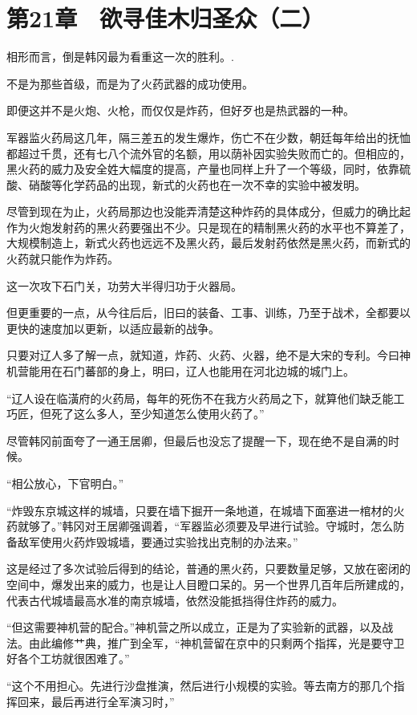 \section{第21章　欲寻佳木归圣众（二）}

相形而言，倒是韩冈最为看重这一次的胜利。.

不是为那些首级，而是为了火药武器的成功使用。

即便这并不是火炮、火枪，而仅仅是炸药，但好歹也是热武器的一种。

军器监火药局这几年，隔三差五的发生爆炸，伤亡不在少数，朝廷每年给出的抚恤都超过千贯，还有七八个流外官的名额，用以荫补因实验失败而亡的。但相应的，黑火药的威力及安全姓大幅度的提高，产量也同样上升了一个等级，同时，依靠硫酸、硝酸等化学药品的出现，新式的火药也在一次不幸的实验中被发明。

尽管到现在为止，火药局那边也没能弄清楚这种炸药的具体成分，但威力的确比起作为火炮发射药的黑火药要强出不少。只是现在的精制黑火药的水平也不算差了，大规模制造上，新式火药也远远不及黑火药，最后发射药依然是黑火药，而新式的火药就只能作为炸药。

这一次攻下石门关，功劳大半得归功于火器局。

但更重要的一点，从今往后后，旧曰的装备、工事、训练，乃至于战术，全都要以更快的速度加以更新，以适应最新的战争。

只要对辽人多了解一点，就知道，炸药、火药、火器，绝不是大宋的专利。今曰神机营能用在石门蕃部的身上，明曰，辽人也能用在河北边城的城门上。

“辽人设在临潢府的火药局，每年的死伤不在我方火药局之下，就算他们缺乏能工巧匠，但死了这么多人，至少知道怎么使用火药了。”

尽管韩冈前面夸了一通王居卿，但最后也没忘了提醒一下，现在绝不是自满的时候。

“相公放心，下官明白。”

“炸毁东京城这样的城墙，只要在墙下掘开一条地道，在城墙下面塞进一棺材的火药就够了。”韩冈对王居卿强调着，“军器监必须要及早进行试验。守城时，怎么防备敌军使用火药炸毁城墙，要通过实验找出克制的办法来。”

这是经过了多次试验后得到的结论，普通的黑火药，只要数量足够，又放在密闭的空间中，爆发出来的威力，也是让人目瞪口呆的。另一个世界几百年后所建成的，代表古代城墙最高水准的南京城墙，依然没能抵挡得住炸药的威力。

“但这需要神机营的配合。”神机营之所以成立，正是为了实验新的武器，以及战法。由此编修艹典，推广到全军，“神机营留在京中的只剩两个指挥，光是要守卫好各个工坊就很困难了。”

“这个不用担心。先进行沙盘推演，然后进行小规模的实验。等去南方的那几个指挥回来，最后再进行全军演习时，”

